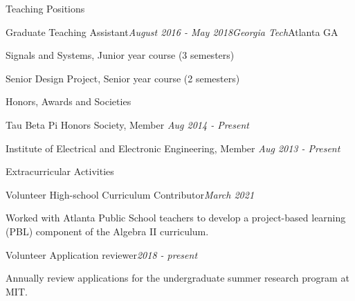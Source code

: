 \documentclass{resume} %
\begin{document}

\begin{rSection}{Teaching Positions}

\begin{rSubsection}{Graduate Teaching Assistant}{\em August 2016 - May 2018}{\em Georgia Tech}{Atlanta GA}
\item Signals and Systems, Junior year course (3 semesters)
\item Senior Design Project, Senior year course (2 semesters)
\end{rSubsection}

\end{rSection}


\begin{rSection}{Honors, Awards and Societies}

\begin{rSubsection}{}{}{}{}
\item Tau Beta Pi Honors Society, Member \hfill {\em Aug 2014 - Present}
\item Institute of Electrical and Electronic Engineering, Member \hfill {\em Aug 2013 - Present}
\end{rSubsection}

\end{rSection}

\begin{rSection}{Extracurricular Activities}

\begin{rSubsection}{Volunteer High-school Curriculum Contributor}{\em March 2021}{}{}
\item Worked with Atlanta Public School teachers to develop a project-based learning (PBL) component of the Algebra II curriculum.
\end{rSubsection}

\begin{rSubsection}{Volunteer Application reviewer}{\em 2018 - present}{}{}
\item Annually review applications for the undergraduate summer research program at MIT.
\end{rSubsection}

\end{rSection}




\end{document}
